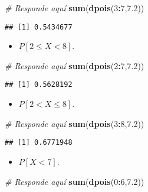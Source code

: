 \documentclass[
]{article}
\newenvironment{Shaded}{\begin{snugshade}}{\end{snugshade}}
\newcommand{\CommentTok}[1]{\textcolor[rgb]{0.56,0.35,0.01}{\textit{#1}}}
\newcommand{\DecValTok}[1]{\textcolor[rgb]{0.00,0.00,0.81}{#1}}
\newcommand{\FloatTok}[1]{\textcolor[rgb]{0.00,0.00,0.81}{#1}}
\newcommand{\KeywordTok}[1]{\textcolor[rgb]{0.13,0.29,0.53}{\textbf{#1}}}
\newcommand{\NormalTok}[1]{#1}
\newcommand{\OperatorTok}[1]{\textcolor[rgb]{0.81,0.36,0.00}{\textbf{#1}}}
\providecommand{\tightlist}{%
  \setlength{\itemsep}{0pt}\setlength{\parskip}{0pt}}
\begin{document}
\begin{Shaded}
\begin{Highlighting}[]
\CommentTok{# Responde aquí}
\KeywordTok{sum}\NormalTok{(}\KeywordTok{dpois}\NormalTok{(}\DecValTok{3}\OperatorTok{:}\DecValTok{7}\NormalTok{,}\FloatTok{7.2}\NormalTok{))}
\end{Highlighting}
\end{Shaded}

\begin{verbatim}
## [1] 0.5434677
\end{verbatim}

\begin{itemize}
\tightlist
\item
  \(P[2 \leq X < 8]\).
\end{itemize}

\begin{Shaded}
\begin{Highlighting}[]
\CommentTok{# Responde aquí}
\KeywordTok{sum}\NormalTok{(}\KeywordTok{dpois}\NormalTok{(}\DecValTok{2}\OperatorTok{:}\DecValTok{7}\NormalTok{,}\FloatTok{7.2}\NormalTok{))}
\end{Highlighting}
\end{Shaded}

\begin{verbatim}
## [1] 0.5628192
\end{verbatim}

\begin{itemize}
\tightlist
\item
  \(P[2 < X \leq 8]\).
\end{itemize}

\begin{Shaded}
\begin{Highlighting}[]
\CommentTok{# Responde aquí}
\KeywordTok{sum}\NormalTok{(}\KeywordTok{dpois}\NormalTok{(}\DecValTok{3}\OperatorTok{:}\DecValTok{8}\NormalTok{,}\FloatTok{7.2}\NormalTok{))}
\end{Highlighting}
\end{Shaded}

\begin{verbatim}
## [1] 0.6771948
\end{verbatim}

\begin{itemize}
\tightlist
\item
  \(P[X < 7]\).
\end{itemize}

\begin{Shaded}
\begin{Highlighting}[]
\CommentTok{# Responde aquí}
\KeywordTok{sum}\NormalTok{(}\KeywordTok{dpois}\NormalTok{(}\DecValTok{0}\OperatorTok{:}\DecValTok{6}\NormalTok{,}\FloatTok{7.2}\NormalTok{))}
\end{Highlighting}
\end{Shaded}
\end{document}
